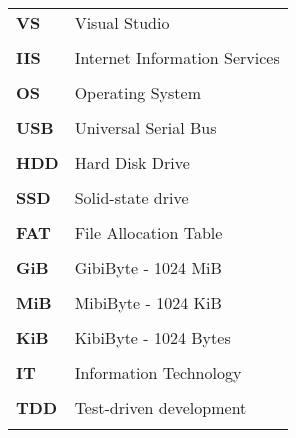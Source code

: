 \begin{longtable}{l p{10cm}}
\textbf{VS} & Visual Studio\\\\
\textbf{IIS} & Internet Information Services\\\\
\textbf{OS} & Operating System\\\\
\textbf{USB} & Universal Serial Bus\\\\
\textbf{HDD} & Hard Disk Drive\\\\
\textbf{SSD} & Solid-state drive\\\\
\textbf{FAT} & File Allocation Table\\\\
\textbf{GiB} & GibiByte - 1024 MiB\\\\
\textbf{MiB} & MibiByte - 1024 KiB\\\\
\textbf{KiB} & KibiByte - 1024 Bytes\\\\
\textbf{IT} & Information Technology\\\\
\textbf{TDD} & Test-driven development \\\\
\end{longtable}




